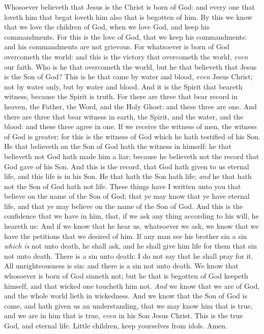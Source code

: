 \documentclass[11pt,letterpaper,oneside]{memoir}
\begin{document}
Whosoever believeth that Jesus is the Christ is born of God: and
every one that loveth him that begat loveth him also that is begotten
of him.  By this we know that we love the children of God, when we
love God, and keep his commandments.  For this is the love of God,
that we keep his commandments: and his commandments are not grievous.
For whatsoever is born of God overcometh the world: and this is the
victory that overcometh the world, \emph{even} our faith.  Who is he
that overcometh the world, but he that believeth that Jesus is the Son
of God?  This is he that came by water and blood, \emph{even} Jesus
Christ; not by water only, but by water and blood. And it is the
Spirit that beareth witness, because the Spirit is truth.  For there
are three that bear record in heaven, the Father, the Word, and the
Holy Ghost: and these three are one.  And there are three that bear
witness in earth, the Spirit, and the water, and the blood: and these
three agree in one.  If we receive the witness of men, the witness of
God is greater: for this is the witness of God which he hath testified
of his Son.  He that believeth on the Son of God hath the witness in
himself: he that believeth not God hath made him a liar; because he
believeth not the record that God gave of his Son.  And this is the
record, that God hath given to us eternal life, and this life is in
his Son.  He that hath the Son hath life; \emph{and} he that hath not
the Son of God hath not life.  These things have I written unto you
that believe on the name of the Son of God; that ye may know that ye
have eternal life, and that ye may believe on the name of the Son of
God.  And this is the confidence that we have in him, that, if we ask
any thing according to his will, he heareth us:  And if we know that
he hear us, whatsoever we ask, we know that we have the petitions that
we desired of him.  If any man see his brother sin a sin \emph{which
is} not unto death, he shall ask, and he shall give him life for them
that sin not unto death. There is a sin unto death: I do not say that
he shall pray for it.  All unrighteousness is sin: and there is a sin
not unto death.  We know that whosoever is born of God sinneth not;
but he that is begotten of God keepeth himself, and that wicked one
toucheth him not.  \emph{And} we know that we are of God, and the
whole world lieth in wickedness.  And we know that the Son of God is
come, and hath given us an understanding, that we may know him that is
true, and we are in him that is true, \emph{even} in his Son Jesus
Christ. This is the true God, and eternal life.  Little children, keep
yourselves from idols. Amen.
\end{document}
